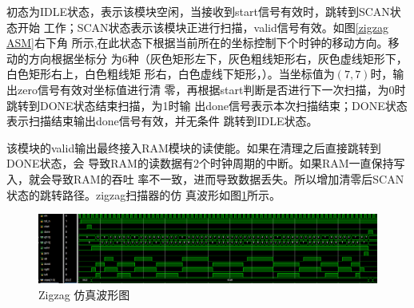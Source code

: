 \documentclass{article}
\numberwithin {equation}{section}
\begin{document}
\begin{spacing}{1.25}
        初态为IDLE状态，表示该模块空闲，当接收到start信号有效时，跳转到SCAN状态开始
        工作；SCAN状态表示该模块正进行扫描，valid信号有效。如图\ref{zigzag ASM}右下角
        所示,在此状态下根据当前所在的坐标控制下个时钟的移动方向。移动的方向根据坐标分
        为6种（灰色矩形左下，灰色粗线矩形右，灰色虚线矩形下，白色矩形右上，白色粗线矩
        形右，白色虚线下矩形，）。当坐标值为$(7,7)$时，输出zero信号有效对坐标值进行清
        零，再根据start判断是否进行下一次扫描，为0时跳转到DONE状态结束扫描，为1时输
        出done信号表示本次扫描结束；DONE状态表示扫描结束输出done信号有效，并无条件
        跳转到IDLE状态。

        该模块的valid输出最终接入RAM模块的读使能。如果在清理之后直接跳转到DONE状态，会
        导致RAM的读数据有2个时钟周期的中断。如果RAM一直保持写入，就会导致RAM的吞吐
        率不一致，进而导致数据丢失。所以增加清零后SCAN状态的跳转路径。zigzag扫描器的仿
        真波形如图\ref{scannerWave}所示。
        \begin{figure}[H]
          \centering
          \includegraphics[scale=0.4]{./pictures/scannerWave.png}
          \caption{Zigzag 仿真波形图}
          \label{scannerWave}
        \end{figure}


\end{spacing}
\end{document}
